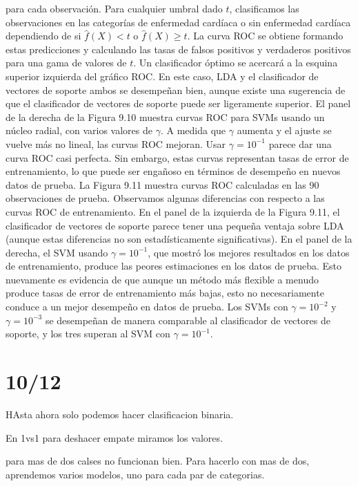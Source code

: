 \begin{example}
para cada observación.
Para cualquier umbral dado $t$, clasificamos las observaciones en las categorías de enfermedad cardíaca o sin enfermedad cardíaca dependiendo de si $\hat{f}(X) < t$ o $\hat{f}(X) \geq t$.
La curva ROC se obtiene formando estas predicciones y calculando las tasas de falsos positivos y verdaderos positivos para una gama de valores de $t$.
Un clasificador óptimo se acercará a la esquina superior izquierda del gráfico ROC.
En este caso, LDA y el clasificador de vectores de soporte ambos se desempeñan bien, aunque existe una sugerencia de que el clasificador de vectores de soporte puede ser ligeramente superior.
El panel de la derecha de la Figura 9.10 muestra curvas ROC para SVMs usando un núcleo radial, con varios valores de $\gamma$.
A medida que $\gamma$ aumenta y el ajuste se vuelve más no lineal, las curvas ROC mejoran.
Usar $\gamma = 10^{-1}$ parece dar una curva ROC casi perfecta.
Sin embargo, estas curvas representan tasas de error de entrenamiento, lo que puede ser engañoso en términos de desempeño en nuevos datos de prueba.
La Figura 9.11 muestra curvas ROC calculadas en las 90 observaciones de prueba.
Observamos algunas diferencias con respecto a las curvas ROC de entrenamiento.
En el panel de la izquierda de la Figura 9.11, el clasificador de vectores de soporte parece tener una pequeña ventaja sobre LDA (aunque estas diferencias no son estadísticamente significativas).
En el panel de la derecha, el SVM usando $\gamma = 10^{-1}$, que mostró los mejores resultados en los datos de entrenamiento, produce las peores estimaciones en los datos de prueba.
Esto nuevamente es evidencia de que aunque un método más flexible a menudo produce tasas de error de entrenamiento más bajas, esto no necesariamente conduce a un mejor desempeño en datos de prueba.
Los SVMs con $\gamma = 10^{-2}$ y $\gamma = 10^{-3}$ se desempeñan de manera comparable al clasificador de vectores de soporte, y los tres superan al SVM con $\gamma = 10^{-1}$.
\end{example}

\section{10/12}


HAsta ahora solo podemos hacer clasificacion binaria. 

En 1vs1 para deshacer empate miramos los valores.

para mas de dos calses no funcionan bien. Para hacerlo con mas de dos, aprendemos varios modelos, uno para cada par de categorias. 


